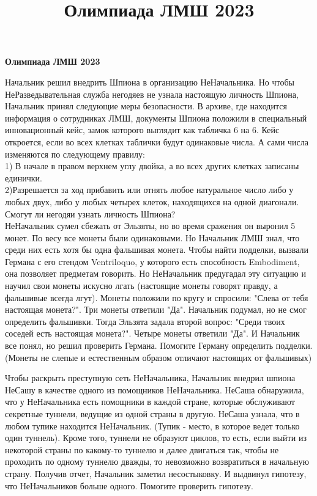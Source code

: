 \vspace{\baselineskip}

\centerline{\bf \Huge Олимпиада ЛМШ 2023}
\title{Олимпиада ЛМШ 2023}

\vspace{\baselineskip}
\vspace{\baselineskip}

Начальник решил внедрить Шпиона в организацию НеНачальника. Но чтобы НеРазведывательная служба негодяев не узнала настоящую личность Шпиона, Начальник принял следующие меры безопасности. В архиве, где находится информация о сотрудниках ЛМШ, документы Шпиона положили в специальный инновационный кейс, замок которого выглядит как табличка 6 на 6. Кейс откроется, если во всех клетках таблички будут одинаковые числа. А сами числа изменяются по следующему правилу:\\
1) В начале в правом верхнем углу двойка, а во всех других клетках записаны единички.\\
2)Разрешается за ход прибавить или отнять любое натуральное число либо у любых двух, либо у любых четырех клеток, находящихся на одной диагонали.\\
Смогут ли негодяи узнать личность Шпиона?\\

НеНачальник сумел сбежать от Эльзяты, но во время сражения он выронил 5 монет. По весу все монеты были одинаковыми. Но Начальник ЛМШ знал, что среди них есть хотя бы одна фальшивая монета. Чтобы найти подделки, вызвали Германа с его стендом Ventriloquo, у которого есть способность Embodiment, она позволяет предметам говорить. Но НеНачальник предугадал эту ситуацию и научил свои монеты искусно лгать (настоящие монеты говорят правду, а фальшивые всегда лгут). Монеты положили по кругу и спросили: "Слева от тебя настоящая монета?". Три монеты ответили "Да". Начальник подумал, но не смог определить фальшивки. Тогда Эльзята задала второй вопрос: "Среди твоих соседей есть настоящая монета?". Четыре монеты ответили "Да". И Начальник все понял, но решил проверить Германа. Помогите Герману определить подделки. (Монеты не слепые и естественным образом отличают настоящих от фальшивых) 

\newpage
\vspace{\baselineskip}  
Чтобы раскрыть преступную сеть НеНачальника, Начальник внедрил шпиона НеСашу в качестве одного из помощников НеНачальника. НеСаша обнаружила, что у НеНачальника есть помощники в каждой стране, которые обслуживают секретные туннели, ведущие из одной страны в другую. НеСаша узнала, что в любом тупике находится НеНачальник. (Тупик - место, в которое ведет только один туннель). Кроме того, туннели не образуют циклов, то есть, если выйти из некоторой страны по какому-то туннелю и далее двигаться так, чтобы не проходить по одному туннелю дважды, то невозможно возвратиться в начальную страну. Получив отчет, Начальник заметил несостыковку. И выдвинул гипотезу, что НеНачальников больше одного. Помогите проверить гипотезу.\\

